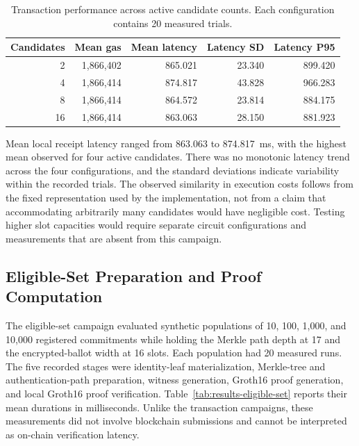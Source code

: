 \begin{table}[t]
\centering
\caption{Transaction performance across active
candidate counts. Each configuration contains
20 measured trials.}
\label{tab:results-candidate-count}
\small
\setlength{\tabcolsep}{4pt}
\begin{tabular}{@{}rrrrr@{}}
\toprule
\textbf{Candidates} &
\textbf{Mean gas} &
\textbf{Mean latency} &
\textbf{Latency SD} &
\textbf{Latency P95} \\
\midrule
2  & 1,866,402 & 865.021 & 23.340 & 899.420 \\
4  & 1,866,414 & 874.817 & 43.828 & 966.283 \\
8  & 1,866,414 & 864.572 & 23.814 & 884.175 \\
16 & 1,866,414 & 863.063 & 28.150 & 881.923 \\
\bottomrule
\end{tabular}
\end{table}

Mean local receipt latency ranged from 863.063 to 874.817~ms, with the highest mean observed for four active candidates. There was no monotonic latency trend across the four configurations, and the standard deviations indicate variability within the recorded trials. The observed similarity in execution costs follows from the fixed representation used by the implementation, not from a claim that accommodating arbitrarily many candidates would have negligible cost. Testing higher slot capacities would require separate circuit configurations and measurements that are absent from this campaign.

\subsection{Eligible-Set Preparation and Proof Computation}
\label{subsec:results-eligible-set}
\label{subsec:discussion-proof-costs}
\label{subsec:discussion-eligible-population}

The eligible-set campaign evaluated synthetic populations of 10, 100, 1,000, and 10,000 registered commitments while holding the Merkle path depth at 17 and the encrypted-ballot width at 16 slots. Each population had 20 measured runs. The five recorded stages were identity-leaf materialization, Merkle-tree and authentication-path preparation, witness generation, Groth16 proof generation, and local Groth16 proof verification. Table~\ref{tab:results-eligible-set} reports their mean durations in milliseconds. Unlike the transaction campaigns, these measurements did not involve blockchain submissions and cannot be interpreted as on-chain verification latency.

